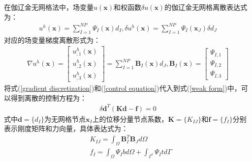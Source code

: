 在伽辽金无网格法中，场变量$u(\pmb{x})$和权函数$\delta u(\pmb{x})$的伽辽金无网格离散表达式为：
\begin{equation}\label{control equation}
\begin{split}
    u^h(\pmb{x})=\sum_{I=1}^{N\!P}\Psi_I(\pmb{x})d_I,\delta u^h(\pmb{x})=\sum_{I=1}^{N\!P}\Psi_I(\pmb x_J)\delta d_J
\end{split}
\end{equation}
对应的场变量梯度离散形式为：
\begin{equation}\label{gradient discretization}
\begin{split}
    \nabla u^h(\pmb{x})=\left[\begin{matrix}
    u_{,1}^h(\pmb{x})\\u_{,2}^h(\pmb{x})\\u_{,3}^h(\pmb{x})\end{matrix}\right]=\sum_{I=1}^{N\!P}\pmb{B}_I(\pmb{x})d_J,\pmb{B}_I(\pmb{x})=\left[\begin{matrix}\Psi_{I,1}\\\Psi_{I,2}\\\Psi_{I,3}\end{matrix}\right]
\end{split}
\end{equation}
将式(\ref{gradient discretization})和(\ref{control equation})代入到式(\ref{weak form})中，可以得到离散的控制方程为：
\begin{equation}
\begin{split}
    \delta\pmb{d}^T(\pmb{K}\pmb{d}-\pmb{f})=0
\end{split}
\end{equation}
式中$\pmb{d}=\{d_I\}$为无网格节点$\pmb{x}_I$上的位移分量节点系数，$\pmb{K}=\{K_{IJ}\}$和$\pmb{f}=\{f_I\}$分别表示刚度矩阵和力向量，具体表达式为：
\begin{equation}
\begin{split}
    &K_{IJ}=\int_{\Omega}\pmb{B}_I^T\pmb{B}_Jd\Omega\\
    &f_I=\int_{\Omega}\Psi_Ibd\Omega+\int_{\Gamma^t}\Psi_Itd\Gamma
\end{split}
\end{equation}

